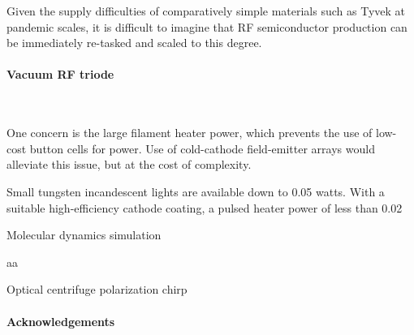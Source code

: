 \documentclass[fleqn,10pt]{article}
\begin{document}
\begin{multicols}{1}
Given the supply difficulties of comparatively simple materials such as Tyvek at pandemic scales, it is difficult to imagine that RF semiconductor production can be immediately re-tasked and scaled to this degree. 

\paragraph{\textbf{Vacuum RF triode}}\

One concern is the large filament heater power, which prevents the use of low-cost button cells for power. Use of cold-cathode field-emitter arrays would alleviate this issue, but at the cost of complexity.

Small tungsten incandescent lights are available down to 0.05 watts. With a suitable high-efficiency cathode coating, a pulsed heater power of less than 0.02



\end{multicols}




\clearpage
{\Large Molecular dynamics simulation}\\
\begin{multicols}{1}


aa





\end{multicols}




\clearpage
{\Large Optical centrifuge polarization chirp}\\
\begin{multicols}{1}







\end{multicols}







\clearpage
\paragraph{Acknowledgements}\
\end{document}
